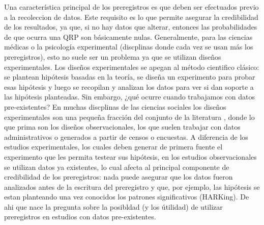 \documentclass[
]{book}
\begin{document}
Una característica principal de los preregistros es que deben ser efectuados previo a la recoleccion de datos. Este requisito es lo que permite asegurar la credibilidad de los resultados, ya que, si no hay datos que alterar, entonces las probabilidades de que ocurra una QRP son básicamente nulas. Generalmente, para las ciencias médicas o la psicología experimental (discplinas donde cada vez se usan más los preregistros), esto no suele ser un problema ya que se utilizan diseños experimentales. Los diseños experimentales se apegan al método cientifico clásico: se plantean hipótesis basadas en la teoría, se diseña un experimento para probar esas hipótesis y luego se recopilan y analizan los datos para ver si dan soporte a las hipótesis planteadas. Sin embargo, ¿qué ocurre cuando trabajamos con datos pre-existentes? En muchas discplinas de las ciencias sociales los diseños experimentales son una pequeña fracción del conjunto de la literatura \citep[e.g.~según][ en 2010, un 3\% de los papers en las mejores revistas de economía eran experimentales]{card_Role_2011}, donde lo que prima son los diseños observacionales, los que suelen trabajar con datos administrativos o generados a partir de censos o encuestas. A diferencia de los estudios experimentales, los cuales deben generar de primera fuente el experimento que les permita testear sus hipótesis, en los estudios observacionales se utilizan datos ya existentes, lo cual afecta al principal componente de credibilidad de los preregistros: nada puede asegurar que los datos fueron analizados antes de la escritura del preregistro y que, por ejemplo, las hipótesis se estan planteando una vez conocidos los patrones significativos (HARKing). De ahi que nace la pregunta sobre la posibldad (y los útilidad) de utilizar preregistros en estudios con datos pre-existentes.
\end{document}
